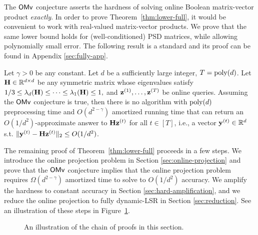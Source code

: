 The $\mathsf{OMv}$ conjecture asserts the hardness of solving online Boolean matrix-vector product \emph{exactly}.
In order to prove Theorem~\ref{thm:lower-full}, it would be convenient to work with real-valued matrix-vector products. 
We prove that the same lower bound holds for (well-conditioned) PSD matrices, while allowing polynomially small error.  
The following result is a standard and its proof can be found in Appendix \ref{sec:fully-app}.
\begin{lemma}
\label{lem:omv-real}
Let $\gamma > 0$ be any constant. Let $d$ be a sufficiently large integer, $T = \operatorname{poly}(d)$. 
Let $\mathbf{H}\in \mathbb{R}^{d \times d}$ be any symmetric matrix whose eigenvalues satisfy 
$
1/3\leq \lambda_d(\mathbf{H}) \leq \cdots \leq \lambda_1(\mathbf{H}) \leq 1,
$
and $\mathbf{z}^{(1)}, \ldots, \mathbf{z}^{(T)}$ be online queries.
Assuming the $\mathsf{OMv}$ conjecture is true, then there is no algorithm with $\operatorname{poly}(d)$ preprocessing time and $O(d^{2-\gamma})$ amortized running time that can return an $O(1/d^{2})$-approximate answer to $\mathbf{H} \mathbf{z}^{(t)}$ for all $t \in [T]$, i.e., a vector $\mathbf{y}^{(t)} \in \mathbb{R}^{d}$ s.t. $\|\mathbf{y}^{(t)} - \mathbf{H} \mathbf{z}^{(t)}\|_2 \leq O(1/d^2)$. 
\end{lemma}


The remaining proof of Theorem~\ref{thm:lower-full} proceeds in a few steps.
We introduce the online projection problem in Section \ref{sec:online-projection} and prove that the $\mathsf{OMv}$ conjecture implies that the online projection problem requires $\Omega(d^{2-\gamma})$ amortized time to solve to $O(1/d^2)$ accuracy.
We amplify the hardness to constant accuracy in Section \ref{sec:hard-amplification}, and we reduce the online projection to fully dynamic-LSR in Section \ref{sec:reduction}. 
See an illustration of these steps in Figure~\ref{fig:fully}.

\begin{figure}[!ht]
  \centering
  \caption{An illustration of the chain of proofs in this section.}
  \label{fig:fully}
\end{figure}





